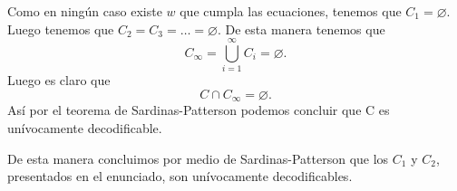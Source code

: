 \begin{sols}
\begin{itemize}
         Como en ningún caso existe $w$ que cumpla las ecuaciones, tenemos que $C_1=\varnothing.$ Luego tenemos que $C_2=C_3=\dots=\varnothing.$ De esta manera tenemos que
         $$C_\infty=\bigcup_{i=1}^\infty C_i=\varnothing.$$
         Luego es claro que
         $$C\cap C_\infty=\varnothing.$$
         Así por el teorema de Sardinas-Patterson podemos concluir que C es unívocamente decodificable.
       \end{itemize}

       De esta manera concluimos por medio de Sardinas-Patterson que los $C_1$ y $C_2$, presentados en el enunciado, son unívocamente decodificables.

       \end{sols}